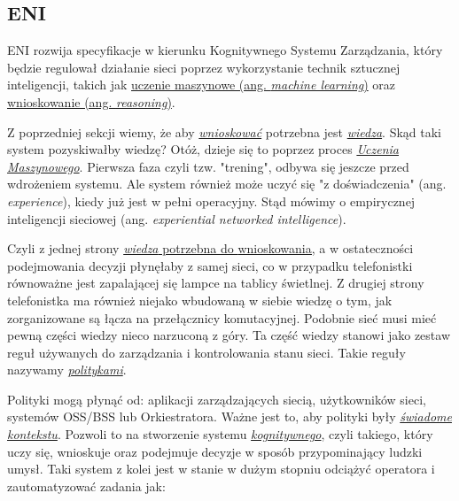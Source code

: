\subsection{ENI}

ENI rozwija specyfikacje w kierunku Kognitywnego Systemu Zarządzania, który będzie regulował działanie sieci poprzez wykorzystanie technik sztucznej inteligencji, takich jak \hyperlink{def:uczenie-maszynowe}{uczenie maszynowe (ang. \textit{machine learning})} oraz \hyperlink{def:wnioskowanie}{wnioskowanie (ang. \textit{reasoning})}. 

Z poprzedniej sekcji wiemy, że aby \hyperlink{def:wnioskowanie}{\textit{wnioskować}} potrzebna jest \hyperlink{def:wiedza}{\textit{wiedza}}. Skąd taki system pozyskiwałby wiedzę? Otóż, dzieje się to poprzez proces \hyperlink{def:uczenie-maszynowe}{\textit{Uczenia Maszynowego}}. Pierwsza faza czyli tzw. "trening", odbywa się jeszcze przed wdrożeniem systemu. Ale system również może uczyć się "z doświadczenia" (ang. \textit{experience}), kiedy już jest w pełni operacyjny. Stąd mówimy o empirycznej inteligencji sieciowej (ang. \textit{experiential networked intelligence}). 

Czyli z jednej strony \hyperlink{def:wiedza}{\textit{wiedza} potrzebna do \hyperlink{def:wnioskowanie}{wnioskowania,}} a w ostateczności podejmowania decyzji płynęłaby z samej sieci, co w przypadku telefonistki równoważne jest zapalającej się lampce na tablicy świetlnej. Z drugiej strony telefonistka ma również niejako wbudowaną w siebie wiedzę o tym, jak zorganizowane są łącza na przełącznicy komutacyjnej. Podobnie sieć musi mieć pewną części wiedzy nieco narzuconą z góry. Ta część wiedzy stanowi jako zestaw reguł używanych do zarządzania i kontrolowania stanu sieci. Takie reguły nazywamy \hyperlink{def:polityka}{\textit{politykami}}.

Polityki mogą płynąć od: aplikacji zarządzających siecią, użytkowników sieci, systemów OSS/BSS lub Orkiestratora. Ważne jest to, aby polityki były \hyperlink{def:swiadomosc-kontekstu}{\textit{świadome kontekstu}}. Pozwoli to na stworzenie systemu \hyperlink{def:kognitywnosc}{\textit{kognitywnego}}, czyli takiego, który uczy się, wnioskuje oraz podejmuje decyzje w sposób przypominający ludzki umysł. Taki system z kolei jest w stanie w dużym stopniu odciążyć operatora i zautomatyzować zadania jak: 


